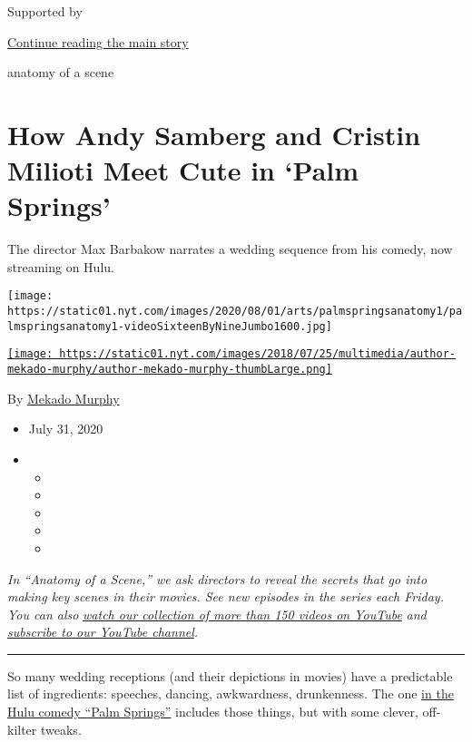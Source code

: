 Supported by

\protect\hyperlink{after-sponsor}{Continue reading the main story}

anatomy of a scene

\hypertarget{how-andy-samberg-and-cristin-milioti-meet-cute-in-palm-springs}{%
\section{How Andy Samberg and Cristin Milioti Meet Cute in `Palm
Springs'}\label{how-andy-samberg-and-cristin-milioti-meet-cute-in-palm-springs}}

The director Max Barbakow narrates a wedding sequence from his comedy,
now streaming on Hulu.

\texttt{[image: https://static01.nyt.com/images/2020/08/01/arts/palmspringsanatomy1/palmspringsanatomy1-videoSixteenByNineJumbo1600.jpg]}

\href{https://www.nytimes.com/by/mekado-murphy}{\texttt{[image: https://static01.nyt.com/images/2018/07/25/multimedia/author-mekado-murphy/author-mekado-murphy-thumbLarge.png]}}

By \href{https://www.nytimes.com/by/mekado-murphy}{Mekado Murphy}

\begin{itemize}
\item
  July 31, 2020
\item
  \begin{itemize}
  \item
  \item
  \item
  \item
  \item
  \end{itemize}
\end{itemize}

\emph{In ``Anatomy of a Scene,'' we ask directors to reveal the secrets
that go into making key scenes in their movies. See new episodes in the
series each Friday. You can also}
\href{https://www.youtube.com/playlist?list=PL4CGYNsoW2iBup_LVjhX7C9qceoMpiLEL}{\emph{watch
our collection of more than 150 videos on YouTube}} \emph{and}
\href{https://www.youtube.com/channel/UCqnbDFdCpuN8CMEg0VuEBqA?sub_confirmation=1}{\emph{subscribe
to our YouTube channel}}\emph{.}

\begin{center}\rule{0.5\linewidth}{\linethickness}\end{center}

So many wedding receptions (and their depictions in movies) have a
predictable list of ingredients: speeches, dancing, awkwardness,
drunkenness. The one
\href{https://www.hulu.com/movie/palm-springs-f70dfd4d-dbfb-46b8-abb3-136c841bba11?\&cmp=13289\&utm_source=google\&utm_medium=SEM\&utm_campaign=CM_SEM_PalmSprings\&utm_term=palm\%20springs\%20hulu\&gclsrc=aw.ds\&ds_rl=1251123\&gclid=Cj0KCQjwoub3BRC6ARIsABGhnybUMcE3YTcib1lAhH7G55y9vQXLZS-uwYcHjUIxOKwWbiAJGnAxRboaAtwlEALw_wcB}{in
the Hulu comedy ``Palm Springs''} includes those things, but with some
clever, off-kilter tweaks.

